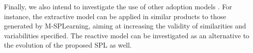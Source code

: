


Finally, we also intend to investigate the use of other adoption models \cite{krueger02}. For instance, the extractive model can be applied in similar products to those generated by M-SPLear\allowbreak ning, aiming at increasing the validity of similarities and variabilities specified. The reactive model can be investigated as an alternative to the evolution of the proposed SPL as well.